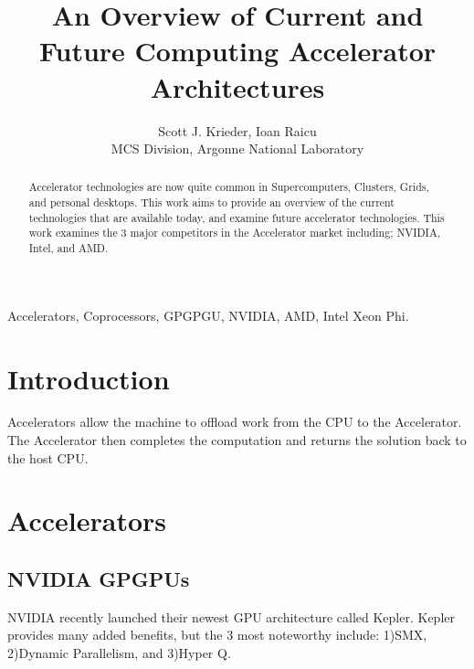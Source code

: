 \documentclass[conference]{IEEEtran}
\begin{document}
%
\title{An Overview of Current and Future Computing Accelerator Architectures}


\author{Scott J. Krieder,
Ioan Raicu\\
MCS Division, Argonne National Laboratory
}


\maketitle

\begin{abstract}
Accelerator technologies are now quite common in Supercomputers, Clusters, Grids, and personal desktops. This work aims to provide an overview of the current technologies that are available today, and examine future accelerator technologies. This work examines the 3 major competitors in the Accelerator market including; NVIDIA, Intel, and AMD.
\end{abstract}

\begin{IEEEkeywords}
Accelerators, Coprocessors, GPGPGU, NVIDIA, AMD, Intel Xeon Phi.
\end{IEEEkeywords}

\IEEEpeerreviewmaketitle

\section{Introduction}
Accelerators allow the machine to offload work from the CPU to the Accelerator. The Accelerator then completes the computation and returns the solution back to the host CPU. 

\section{Accelerators}

\subsection{NVIDIA GPGPUs}
NVIDIA recently launched their newest GPU architecture called Kepler. \cite{NVIDIA_Kepler} Kepler provides many added benefits, but the 3 most noteworthy include: 1)SMX,  2)Dynamic Parallelism, and 3)Hyper Q.
\end{document}

